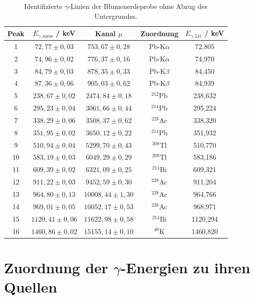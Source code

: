 \begin{table}[H]
\centering
\caption{Identifizierte $\gamma$-Linien der Blumenerdeprobe ohne Abzug des Untergrundes. \cite{NuDat3}}
\label{tab:erde_peaks}
\begin{tabular}{ccccc}
\toprule
Peak & $E_{\gamma,\mathrm{mess}}$ / keV & Kanal $\mu$ & Zuordnung & $E_{\gamma,\mathrm{Lit}}$ / keV \\
\midrule
1  & $72,77 \pm 0,03$   & $753,67 \pm 0,28$   & Pb-K$\alpha$      & 72,805 \\
2  & $74,96 \pm 0,02$   & $776,37 \pm 0,16$   & Pb-K$\alpha$      & 74,970 \\
3  & $84,79 \pm 0,03$   & $878,35 \pm 0,33$   & Pb-K$\beta$       & 84,450 \\
4  & $87,36 \pm 0,06$   & $905,03 \pm 0,62$   & Pb-K$\beta$       & 84,939 \\
5  & $238,67 \pm 0,02$  & $2474,84 \pm 0,18$  & $^{212}$Pb        & 238,632 \\
6  & $295,23 \pm 0,04$  & $3061,66 \pm 0,44$  & $^{214}$Pb        & 295,224 \\
7  & $338,29 \pm 0,06$  & $3508,37 \pm 0,62$  & $^{228}$Ac        & 338,320 \\
8  & $351,95 \pm 0,02$  & $3650,12 \pm 0,22$  & $^{214}$Pb        & 351,932 \\
9  & $510,94 \pm 0,04$  & $5299,70 \pm 0,43$  & $^{208}$Tl        & 510,770 \\
10 & $583,19 \pm 0,03$  & $6049,29 \pm 0,29$  & $^{208}$Tl        & 583,186 \\
11 & $609,39 \pm 0,02$  & $6321,09 \pm 0,25$  & $^{214}$Bi        & 609,321 \\
12 & $911,22 \pm 0,03$  & $9452,59 \pm 0,30$  & $^{228}$Ac        & 911,204 \\
13 & $964,80 \pm 0,13$  & $10008,44 \pm 1,30$ & $^{228}$Ac        & 964,766 \\
14 & $969,01 \pm 0,05$  & $10052,17 \pm 0,53$ & $^{228}$Ac        & 968,971 \\
15 & $1120,41 \pm 0,06$ & $11622,98 \pm 0,58$ & $^{214}$Bi        & 1120,294 \\
16 & $1460,86 \pm 0,02$ & $15155,14 \pm 0,10$ & $^{40}$K          & 1460,820 \\
\bottomrule
\end{tabular}
\end{table}

\section{Zuordnung der $\gamma$-Energien zu ihren Quellen}


